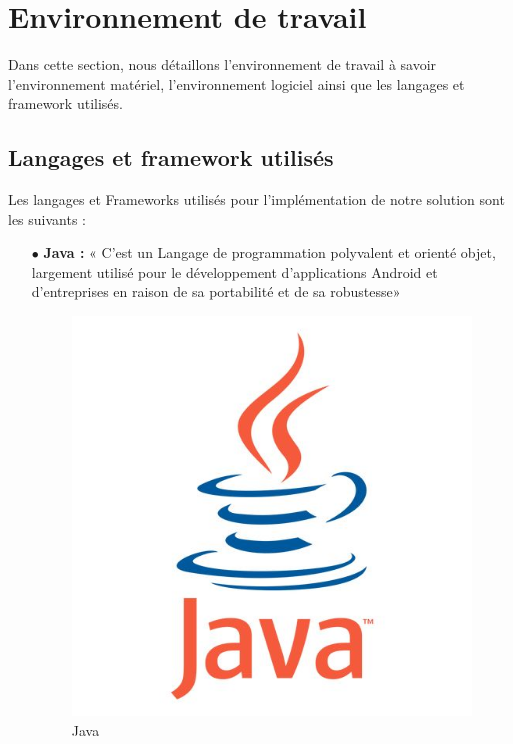 \newpage
\section{Environnement de travail}
Dans cette section, nous détaillons l'environnement de travail à savoir l'environnement matériel, l'environnement logiciel ainsi que les langages et framework utilisés.

\subsection{ Langages et framework utilisés }
\noindent Les langages et Frameworks utilisés pour l'implémentation de notre solution sont les suivants :

\begin{itemize}
    \item[$\bullet$] \textbf{ Java :}
          « C'est un Langage de programmation polyvalent et orienté objet, largement utilisé pour le développement d'applications Android et d'entreprises en raison de sa portabilité et de sa robustesse»

          \begin{figure}[ht]
              \centering \includegraphics[scale=0.2]{chap1.images/java.jpg}
              \caption{Java}
              \label{JAVA}
          \end{figure}




\end{itemize}
